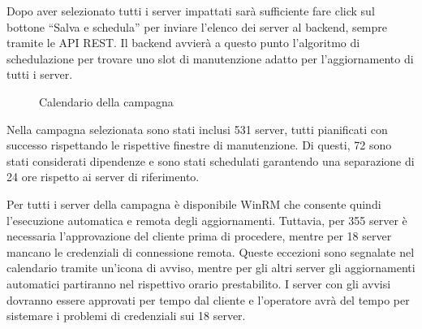 Dopo aver selezionato tutti i server impattati sarà sufficiente fare click sul 
bottone “Salva e schedula” per inviare l’elenco dei server al backend, sempre 
tramite le API REST. 
Il backend avvierà a questo punto l’algoritmo di schedulazione per trovare uno
slot di manutenzione adatto per l'aggiornamento di tutti i server.

\begin{figure}[H]
\begin{flushright}
    \centering
    \caption{Calendario della campagna}
    \label{fig:Calendario della campagna}
\end{flushright}
\end{figure}

Nella campagna selezionata sono stati inclusi 531 server, tutti pianificati con 
successo rispettando le rispettive finestre di manutenzione. Di questi, 72 sono 
stati considerati dipendenze e sono stati schedulati garantendo una separazione 
di 24 ore rispetto ai server di riferimento.

Per tutti i server della campagna è disponibile WinRM che consente quindi 
l'esecuzione automatica e remota degli aggiornamenti. Tuttavia, per 355 server 
è necessaria l'approvazione del cliente prima di procedere, mentre per 18 
server mancano le credenziali di connessione remota. Queste eccezioni sono 
segnalate nel calendario tramite un'icona di avviso, mentre per gli altri server 
gli aggiornamenti automatici partiranno nel rispettivo orario prestabilito.
I server con gli avvisi dovranno essere approvati per tempo dal cliente e 
l'operatore avrà del tempo per sistemare i problemi di credenziali sui 18 server.\\

